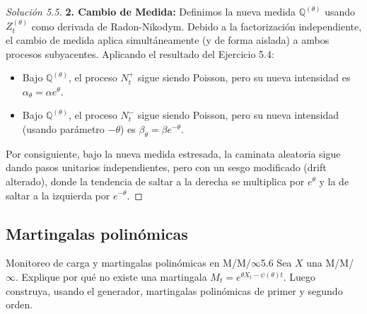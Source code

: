 \documentclass[10pt,a4paper]{article}
\begin{document}
\begin{proof}[Solución 5.5]
    \textbf{2. Cambio de Medida:}
    Definimos la nueva medida $\mathbb{Q}^{(\theta)}$ usando $Z_t^{(\theta)}$ como derivada de Radon-Nikodym.
    Debido a la factorización independiente, el cambio de medida aplica simultáneamente (y de forma aislada) a ambos procesos subyacentes.
    Aplicando el resultado del Ejercicio 5.4:
    \begin{itemize}
        \item Bajo $\mathbb{Q}^{(\theta)}$, el proceso $N_t^+$ sigue siendo Poisson, pero su nueva intensidad es $\alpha_\theta = \alpha e^\theta$.
        \item Bajo $\mathbb{Q}^{(\theta)}$, el proceso $N_t^-$ sigue siendo Poisson, pero su nueva intensidad (usando parámetro $-\theta$) es $\beta_\theta = \beta e^{-\theta}$.
    \end{itemize}
    Por consiguiente, bajo la nueva medida estresada, la caminata aleatoria sigue dando pasos unitarios independientes, pero con un sesgo modificado (drift alterado), donde la tendencia de saltar a la derecha se multiplica por $e^\theta$ y la de saltar a la izquierda por $e^{-\theta}$.
\end{proof}

\newpage
\subsection{Martingalas polinómicas}

\begin{ejercicio}{Monitoreo de carga y martingalas polinómicas en M/M/$\infty$}{5.6}
    Sea $X$ una M/M/$\infty$. Explique por qué no existe una martingala $M_t = e^{\theta X_t - \psi(\theta)t}$. Luego construya, usando el generador, martingalas polinómicas de primer y segundo orden.
\end{ejercicio}
\end{document}
